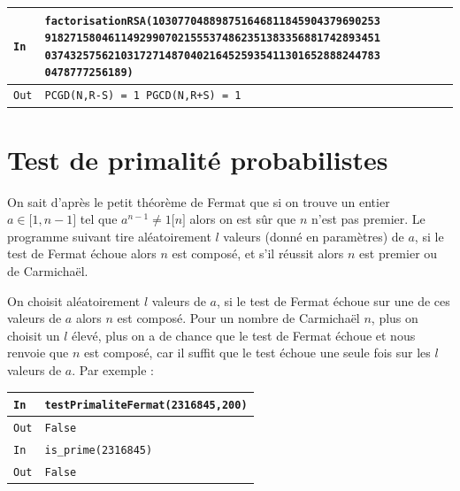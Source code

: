\documentclass[titlepage]{article}
\begin{document}
    \begin{tabularx}{12cm}{|p{0.60cm}|X|}
        \hline
        \rowcolor{gray}
        \texttt{In}
        & 
        \texttt{factorisationRSA(103077048898751646811845904379690253}
        \texttt{91827158046114929907021555374862351383356881742893451}
        \texttt{03743257562103172714870402164525935411301652888244783}
        \texttt{0478777256189)}
        \\
        \hline
        \texttt{Out}
        &
        \texttt{PCGD(N,R-S) =  1 \newline
        PGCD(N,R+S) =  1}
        \\
        \hline
    \end{tabularx}
    \bigbreak
    

    \section{Test de primalité probabilistes}
    On sait d'après le petit théorème de Fermat que si on trouve un entier $a \in \lbrack1,n-1\rbrack$
    tel que $a^{n-1} \neq 1 \lbrack n \rbrack$ alors on est sûr que $n$ n'est pas premier. 
    Le programme suivant tire aléatoirement $l$ valeurs (donné en paramètres) de $a$, 
    si le test de Fermat échoue alors $n$ est composé, et s'il réussit alors $n$ est premier ou de Carmichaël.

    

    On choisit aléatoirement $l$ valeurs de $a$, si le test de Fermat échoue sur une de ces valeurs de $a$ alors
    $n$ est composé. Pour un nombre de Carmichaël $n$, plus on choisit un $l$ élevé, plus on a de chance que le test
    de Fermat échoue et nous renvoie que $n$ est composé, car il suffit que le test échoue une seule fois sur les $l$ 
    valeurs de $a$. \bigbreak
    Par exemple : \bigbreak

    \begin{tabularx}{12cm}{|p{0.60cm}|X|}
        \hline
        \rowcolor{gray}
        \texttt{In}
        & 
        \texttt{testPrimaliteFermat(2316845,200)}
        \\
        \hline
        \texttt{Out}
        &
        \texttt{False}
        \\
        \hline
        \rowcolor{gray}
        \texttt{In}
        & 
        \texttt{is\_prime(2316845)}
        \\
        \hline
        \texttt{Out}
        &
        \texttt{False}
        \\
        \hline
    \end{tabularx}
    \bigbreak
\end{document}
